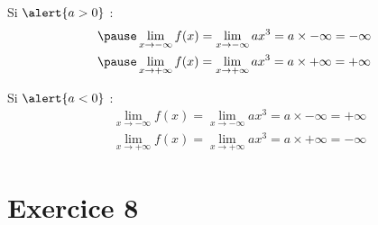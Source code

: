\documentclass[9pt,handout,professionalfonts,hyperref]{beamer}
\begin{document}
\begin{frame}
Si $\alert{a>0}$ :
\[\begin{aligned}
\pause &\lim_{x \to -\infty} f(x)=\lim_{x \to -\infty} ax^3 =a\times -\infty = -\infty \\
\pause &\lim_{x \to +\infty} f(x)=\lim_{x \to +\infty} ax^3 =a\times +\infty = +\infty 
\end{aligned}\]

\pause
\medskip
\begin{adjustbox}{width=\textwidth,center}
\end{adjustbox}


\end{frame}

\begin{frame}
Si $\alert{a<0}$ : 
\[\begin{aligned}
&\lim_{x \to -\infty} f(x)=\lim_{x \to -\infty} ax^3 = a\times -\infty = +\infty \\
&\lim_{x \to +\infty} f(x)=\lim_{x \to +\infty} ax^3 = a\times +\infty =-\infty 
\end{aligned}\]

\pause
\medskip
\begin{adjustbox}{width=\textwidth,center}
\end{adjustbox}

\end{frame}

\section{Exercice 8}
\end{document}
